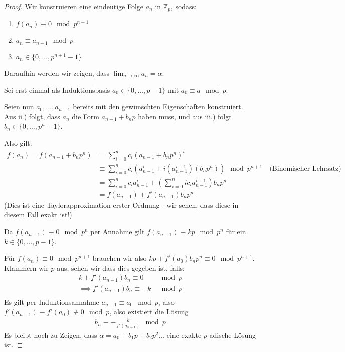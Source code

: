 \documentclass{report}
\newcommand*{\newpar}{\par\vspace{\baselineskip}\noindent}
\newcommand{\bZ}{\mathbb{Z}}
\begin{document}
	\begin{proof}
		Wir konstruieren eine eindeutige Folge $a_n$ in $\bZ_p$, sodass:
		\begin{enumerate}
			\item $f(a_n) \equiv 0 \mod p^{n + 1}$
			\item $a_n \equiv a_{n - 1} \mod p$
			\item $a_n \in  \{0, \hdots, p^{n+1} - 1\}$
		\end{enumerate}
	\noindent Daraufhin werden wir zeigen, dass $\displaystyle \lim_{n \to \infty} a_n = \alpha$.
	\newpar
	Sei erst einmal als Induktionsbasis $a_0 \in \{0, \hdots, p - 1\}$ mit $a_0 \equiv a \mod p$.
	\newpar
	Seien nun $a_0, \hdots, a_{n-1}$ bereits mit den gewünschten Eigenschaften konstruiert.
	Aus ii.) folgt, dass $a_n$ die Form $a_{n-1} + b_np$ haben muss, und aus iii.) folgt $b_n \in \{0, \hdots, p^n-1\}$.
	\newpar 
	Also gilt:
	\begin{align*}
		f(a_n) = f(a_{n - 1} + b_np^n) &= \sum_{i = 0}^n c_i(a_{n - 1} + b_np^n)^i\\
			                         &\equiv \sum_{i = 0}^n c_i(a_{n-1}^i + i(a_{n-1}^{i-1})(b_np^n)) \mod p^{n+1} \quad\text{(Binomischer Lehrsatz)}\\
			                    	 &= \sum_{i = 0}^n c_ia_{n-1}^i + \left(\sum_{i = 0}^nic_i a_{n-1}^{i-1}\right)b_np^n\\
			                    	 &= f(a_{n-1}) + f'(a_{n-1}) b_n p^n
	\end{align*}
	(Dies ist eine Taylorapproximation erster Ordnung - wir sehen, dass diese in diesem Fall exakt ist!)
	\newpar
	Da $f(a_{n-1}) \equiv 0 \mod p^n$ per Annahme gilt $f(a_{n-1}) \equiv kp \mod p^n$ für ein $k \in \{0, \hdots, p-1\}$.
	\newpar
	Für $f(a_n) \equiv 0 \mod p^{n+1}$ brauchen wir also $kp + f'(a_0) b_n p^n \equiv 0 \mod p^{n+1}$. Klammern wir $p$ aus, sehen wir dass dies gegeben ist, falls:
	\begin{align*}
		k + f'(a_{n-1}) b_n \equiv 0 &\mod p\\
		\implies f'(a_{n-1}) b_n \equiv -k &\mod p\\
	\end{align*}
	Es gilt per Induktionsannahme $a_{n-1} \equiv a_0 \mod p$, also $f'(a_{n-1}) \equiv f'(a_0) \not\equiv 0 \mod p$, also existiert die Lösung
	\begin{align*}
		b_n \equiv -\frac{k}{f'(a_{n-1})} \mod p
	\end{align*}
	Es bleibt noch zu Zeigen, dass $\alpha = a_0 + b_1p + b_2p^2 \hdots$ eine exakte $p$-adische Lösung ist. 

\end{proof}
\end{document}
